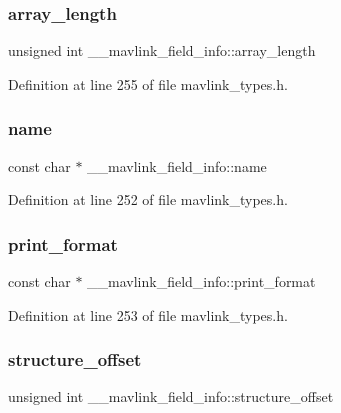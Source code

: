 \subsubsection{\texorpdfstring{array\_length}{array\_length}}
{\footnotesize\ttfamily unsigned int \+\_\+\+\_\+mavlink\+\_\+field\+\_\+info\+::array\+\_\+length}



Definition at line 255 of file mavlink\+\_\+types.\+h.

\mbox{\label{struct____mavlink__field__info_ab896b0406f6fc7fc6cf55107726b4a7b}} 
\subsubsection{\texorpdfstring{name}{name}}
{\footnotesize\ttfamily const char $\ast$ \+\_\+\+\_\+mavlink\+\_\+field\+\_\+info\+::name}



Definition at line 252 of file mavlink\+\_\+types.\+h.

\mbox{\label{struct____mavlink__field__info_a373aca57df3879748585f472cff7e3ba}} 
\subsubsection{\texorpdfstring{print\_format}{print\_format}}
{\footnotesize\ttfamily const char $\ast$ \+\_\+\+\_\+mavlink\+\_\+field\+\_\+info\+::print\+\_\+format}



Definition at line 253 of file mavlink\+\_\+types.\+h.

\mbox{\label{struct____mavlink__field__info_acb947cd22e51e70e8b5f677b543196ac}} 
\subsubsection{\texorpdfstring{structure\_offset}{structure\_offset}}
{\footnotesize\ttfamily unsigned int \+\_\+\+\_\+mavlink\+\_\+field\+\_\+info\+::structure\+\_\+offset}



